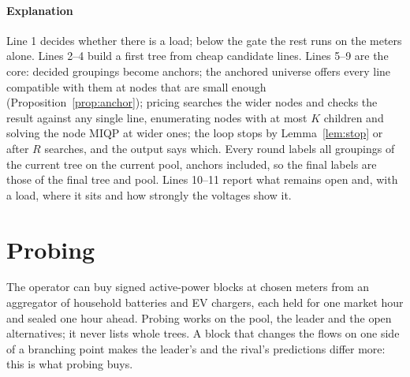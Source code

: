 \documentclass[journal,onecolumn,11pt]{IEEEtran}
\begin{document}
\paragraph*{Explanation} Line 1 decides whether there is a load; below the gate the rest runs on the meters alone. Lines 2--4
build a first tree from cheap candidate lines. Lines 5--9 are the core: decided groupings become anchors; the anchored
universe offers every line compatible with them at nodes that are small enough (Proposition~\ref{prop:anchor}); pricing
searches the wider nodes and checks the result against any single line, enumerating nodes with at most $K$ children and
solving the node MIQP at wider ones; the loop stops by Lemma~\ref{lem:stop} or after $R$
searches, and the output says which. Every round labels all groupings of the current tree on the current pool, anchors
included, so the final labels are those of the final tree and pool. Lines 10--11 report what remains open and, with a load,
where it sits and how strongly the voltages show it.

\section{Probing}\label{sec:probe}

The operator can buy signed active-power blocks at chosen meters from an aggregator of household batteries and EV chargers,
each held for one market hour and sealed one hour ahead. Probing works on the pool, the leader and the open alternatives; it
never lists whole trees. A block that changes the flows on one side of a branching point makes the leader's and the rival's
predictions differ more: this is what probing buys.
\end{document}
